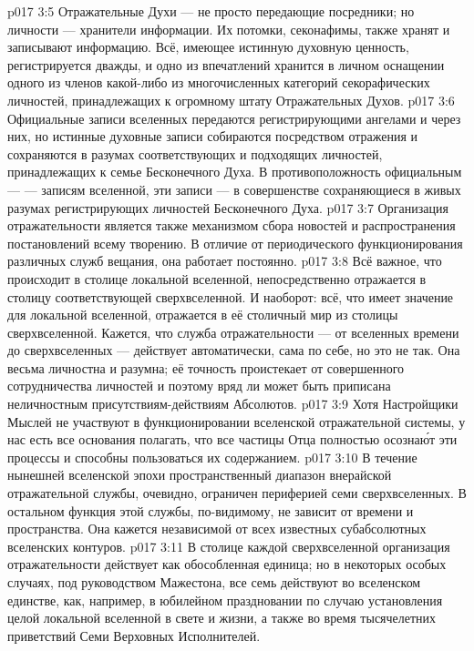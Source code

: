 \vs p017 3:5 \pc Отражательные Духи --- не просто передающие посредники; но личности --- хранители информации. Их потомки, секонафимы, также хранят и записывают информацию. Всё, имеющее истинную духовную ценность, регистрируется дважды, и одно из впечатлений хранится в личном оснащении одного из членов какой\hyp{}либо из многочисленных категорий секорафических личностей, принадлежащих к огромному штату Отражательных Духов.
\vs p017 3:6 Официальные записи вселенных передаются регистрирующими ангелами и через них, но истинные духовные записи собираются посредством отражения и сохраняются в разумах соответствующих и подходящих личностей, принадлежащих к семье Бесконечного Духа. В противоположность официальным ---  --- записям вселенной, эти записи ---  в совершенстве сохраняющиеся в живых разумах регистрирующих личностей Бесконечного Духа.
\vs p017 3:7 Организация отражательности является также механизмом сбора новостей и распространения постановлений всему творению. В отличие от периодического функционирования различных служб вещания, она работает постоянно.
\vs p017 3:8 Всё важное, что происходит в столице локальной вселенной, непосредственно отражается в столицу соответствующей сверхвселенной. И наоборот: всё, что имеет значение для локальной вселенной, отражается в её столичный мир из столицы сверхвселенной. Кажется, что служба отражательности --- от вселенных времени до сверхвселенных --- действует автоматически, сама по себе, но это не так. Она весьма личностна и разумна; её точность проистекает от совершенного сотрудничества личностей и поэтому вряд ли может быть приписана неличностным присутствиям\hyp{}действиям Абсолютов.
\vs p017 3:9 Хотя Настройщики Мыслей не участвуют в функционировании вселенской отражательной системы, у нас есть все основания полагать, что все частицы Отца полностью осозна\'ют эти процессы и способны пользоваться их содержанием.
\vs p017 3:10 \pc В течение нынешней вселенской эпохи пространственный диапазон внерайской отражательной службы, очевидно, ограничен периферией семи сверхвселенных. В остальном функция этой службы, по\hyp{}видимому, не зависит от времени и пространства. Она кажется независимой от всех известных субабсолютных вселенских контуров.
\vs p017 3:11 В столице каждой сверхвселенной организация отражательности действует как обособленная единица; но в некоторых особых случаях, под руководством Мажестона, все семь действуют во вселенском единстве, как, например, в юбилейном праздновании по случаю установления целой локальной вселенной в свете и жизни, а также во время тысячелетних приветствий Семи Верховных Исполнителей.

